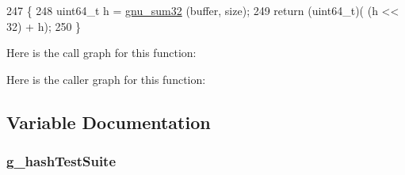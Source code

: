 \begin{DoxyCode}
247 \{
248   uint64\_t h = \hyperlink{hash-test-suite_8cc_a31fea16bc13f0960dc1fa95592bde055}{gnu\_sum32} (buffer, size);
249   \textcolor{keywordflow}{return} (uint64\_t)( (h << 32) + h);
250 \}
\end{DoxyCode}


Here is the call graph for this function\+:




Here is the caller graph for this function\+:




\subsection{Variable Documentation}
\subsubsection[{\texorpdfstring{g\+\_\+hash\+Test\+Suite}{g_hashTestSuite}}]{ g\+\_\+hash\+Test\+Suite\hspace{0.3cm}{\ttfamily [static]}}\hypertarget{hash-test-suite_8cc_a321101b76857d96930ef20eefcabdf58}{}\label{hash-test-suite_8cc_a321101b76857d96930ef20eefcabdf58}
